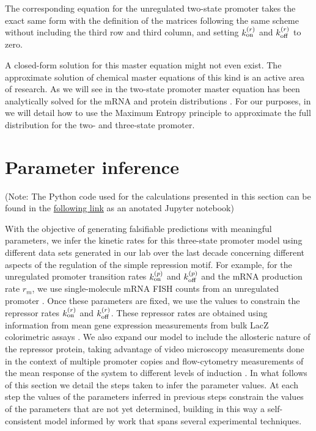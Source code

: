 The corresponding equation for the unregulated two-state promoter takes the
exact same form with the definition of the matrices following the same scheme
without including the third row and third column, and setting $k^{(r)}_{\text{on}}$ and
$k^{(r)}_{\text{off}}$ to zero.

A closed-form solution for this master equation might not even exist. The
approximate solution of chemical master equations of this kind is an active
area of research. As we will see in  the two-state
promoter master equation has been analytically solved for the mRNA
\cite{Peccoud1995} and protein distributions \cite{Shahrezaei2008}. For our
purposes, in  we will detail how to use the Maximum Entropy
principle to approximate the full distribution for the two- and three-state
promoter.

\section{Parameter inference}\label{supp_param_inference}

(Note: The Python code used for the calculations presented in this section can
be found in the
\href{https://www.rpgroup.caltech.edu//chann_cap/software/chemical_master_mRNA_FISH_mcmc.html}{following
link} as an anotated Jupyter notebook)

With the objective of generating falsifiable predictions with meaningful
parameters, we infer the kinetic rates for this three-state promoter model
using different data sets generated in our lab over the last decade concerning
different aspects of the regulation of the simple repression motif. For
example, for the unregulated promoter transition rates $k^{(p)}_{\text{on}}$ and $k^{(p)}_{\text{off}}$ and
the mRNA production rate $r_m$, we use single-molecule mRNA FISH counts from an
unregulated promoter \cite{Jones2014a}. Once these parameters are fixed, we use
the values to constrain the repressor rates $k^{(r)}_{\text{on}}$ and $k^{(r)}_{\text{off}}$. These
repressor rates are obtained using information from mean gene expression
measurements from bulk LacZ colorimetric assays \cite{Garcia2011c}. We also
expand our model to include the allosteric nature of the repressor protein,
taking advantage of video microscopy measurements done in the context of
multiple promoter copies \cite{Brewster2014} and flow-cytometry measurements of
the mean response of the system to different levels of induction
\cite{Razo-Mejia2018}. In what follows of this section we detail the steps
taken to infer the parameter values. At each step the values of the parameters
inferred in previous steps constrain the values of the parameters that are not
yet determined, building in this way a self-consistent model informed by work
that spans several experimental techniques.

